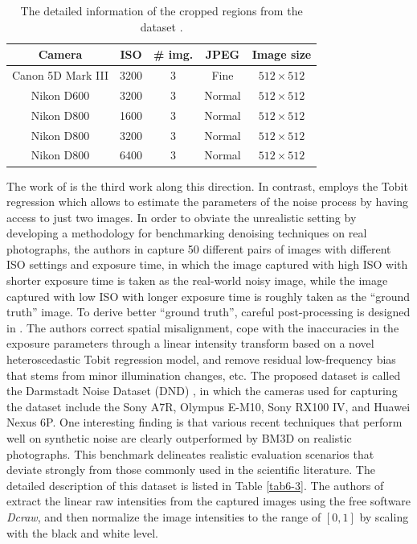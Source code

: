 \begin{table}[ht!]
\caption{The detailed information of the cropped regions from the dataset \cite{crosschannel2016}.}
\vspace{-5mm}
\label{tab6-2}
\begin{center}
\small
\renewcommand\arraystretch{1.2}
\begin{tabular*}{1\textwidth}{@{\extracolsep{\fill}}ccccc}
\hline
Camera
& 
ISO
&
\# img.
&
JPEG
&
Image size
\\
\hline
Canon 5D Mark III & 3200  & 3  & Fine & $512\times512$
\\
\hline
Nikon D600 & 3200 & 3  & Normal & $512\times512$
\\
\hline   
Nikon D800 & 1600 & 3  & Normal & $512\times512$
\\
\hline   
Nikon D800 & 3200 & 3  & Normal & $512\times512$
\\
\hline   
Nikon D800 & 6400 & 3  & Normal & $512\times512$
\\
\hline
\end{tabular*}
\end{center}
\end{table}

The work of \cite{dnd2017} is the third work along this direction. In contrast, \cite{dnd2017} employs the Tobit regression which allows to estimate the parameters of the noise process by having access to just two images. In order to obviate the unrealistic setting by developing a methodology for benchmarking denoising techniques on real photographs, the authors in \cite{dnd2017} capture 50 different pairs of images with different ISO settings and exposure time, in which the image captured with high ISO with shorter exposure time is taken as the real-world noisy image, while the image captured with low ISO with longer exposure time is roughly taken as the ``ground truth'' image. To derive better ``ground truth'', careful post-processing is designed in \cite{dnd2017}. The authors correct spatial misalignment, cope with the inaccuracies in the exposure parameters through a linear intensity transform based on a novel heteroscedastic Tobit regression model, and remove residual low-frequency bias that stems from minor illumination changes, etc. The proposed dataset is called the Darmstadt Noise Dataset (DND) \cite{dnd2017}, in which the cameras used for capturing the dataset include the Sony A7R, Olympus E-M10, Sony RX100 IV, and Huawei Nexus 6P. One interesting finding is that various recent techniques that perform well on synthetic noise are clearly outperformed by BM3D \cite{bm3d} on realistic photographs. This benchmark delineates realistic evaluation scenarios that deviate strongly from those commonly used in the scientific literature. The detailed description of this dataset is listed in Table \ref{tab6-3}. The authors of \cite{dnd2017} extract the linear raw intensities from the captured images using the free software \textsl{Dcraw}, and then normalize the image intensities to the range of $[0, 1]$ by scaling with the black and white level.

